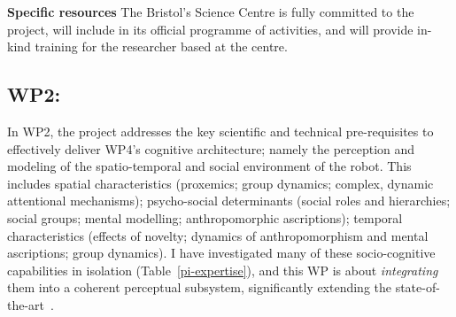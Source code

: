 \textbf{Specific resources} The Bristol's Science Centre is fully committed to the
project, will include \project in its official programme of activities, and will
provide in-kind training for the \project researcher based at the centre.

% 
% 
% 
% 
% 
% 
% 
% 
% 



\subsection{WP2: \textbf{\wpTwo}}


In WP2, the project addresses the key scientific and technical pre-requisites to
effectively deliver WP4's cognitive architecture; namely the perception and modeling of
the spatio-temporal and social environment of the robot. This includes spatial
characteristics (proxemics; group dynamics; complex, dynamic attentional
mechanisms); psycho-social determinants (social roles and hierarchies; social
groups; mental modelling; anthropomorphic ascriptions); temporal characteristics
(effects of novelty; dynamics of anthropomorphism and mental ascriptions; group
dynamics). I have investigated many of these socio-cognitive capabilities in
isolation (Table~\ref{pi-expertise}), and this WP is about
\emph{integrating} them into a coherent perceptual subsystem, significantly
extending the state-of-the-art~\cite{lemaignan2017artificial, baxter2016cognitive}.

